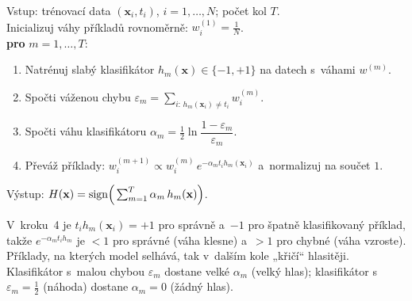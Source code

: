 \begin{algo}
Vstup: trénovací data $(\mathbf{x}_i,t_i)$, $i=1,\dots,N$; počet kol $T$.\\[2pt]
Inicializuj váhy příkladů rovnoměrně: $w_i^{(1)}=\tfrac1N$. \\
\textbf{pro} $m=1,\dots,T$:
\begin{enumerate}[leftmargin=2.4em,itemsep=1pt]
  \item Natrénuj slabý klasifikátor $h_m(\mathbf{x})\in\{-1,+1\}$ na datech s~váhami $w^{(m)}$.
  \item Spočti váženou chybu \;$\varepsilon_m=\sum_{i:\,h_m(\mathbf{x}_i)\ne t_i} w_i^{(m)}$. 
  \item Spočti váhu klasifikátoru \;$\alpha_m=\tfrac12\ln\!\dfrac{1-\varepsilon_m}{\varepsilon_m}$. 
  \item Převáž příklady: \;$w_i^{(m+1)}\propto w_i^{(m)}\,e^{-\alpha_m t_i h_m(\mathbf{x}_i)}$ a~normalizuj na součet $1$. 
\end{enumerate}
Výstup: \;$H(\mathbf{x})=\operatorname{sign}\!\Big(\sum_{m=1}^{T}\alpha_m\,h_m(\mathbf{x})\Big)$. 
\end{algo}

\begin{intuice}
V~kroku~4 je $t_i h_m(\mathbf{x}_i)=+1$ pro správně a~$-1$ pro špatně klasifikovaný příklad, takže $e^{-\alpha_m t_i h_m}$ je $<1$ pro správné (váha klesne) a~$>1$ pro chybné (váha vzroste). Příklady, na kterých model selhává, tak v~dalším kole „křičí`` hlasitěji. Klasifikátor s~malou chybou $\varepsilon_m$ dostane velké $\alpha_m$ (velký hlas); klasifikátor s~$\varepsilon_m=\tfrac12$ (náhoda) dostane $\alpha_m=0$ (žádný hlas).
\end{intuice}

